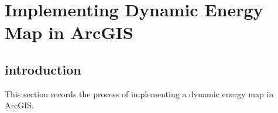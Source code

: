 
\chapter{Implementing Dynamic Energy Map in
  ArcGIS} %

\label{AppendixC} %

\section{introduction}
This section records the process of implementing a dynamic energy map
in ArcGIS.